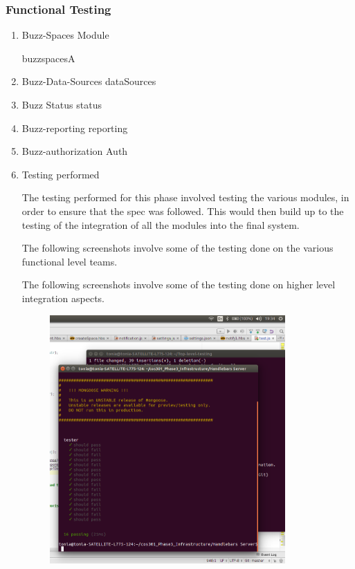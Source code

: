 \documentclass[hidelinks, 12pt, oneside]{article}
\begin{document}
\subsubsection{Functional Testing}
\begin {enumerate}
\item Buzz-Spaces Module

 {buzzspacesA}

\item Buzz-Data-Sources
 {dataSources}

\item Buzz Status
 {status}

\item Buzz-reporting
 {reporting}

\item Buzz-authorization
 {Auth}

\item Testing performed 

The testing performed for this phase involved testing the various modules, in order to ensure that the spec was followed. This would then build up to the testing of the integration of all the modules into the final system.

The following screenshots involve some of the testing done on the various functional level teams.

The following screenshots involve some of the testing done on higher level integration aspects.

\begin{figure}[h!]
  \centering
    \includegraphics[width=0.85\textwidth]{Testing} 
\end{figure}


\end{enumerate}
\end{document}
